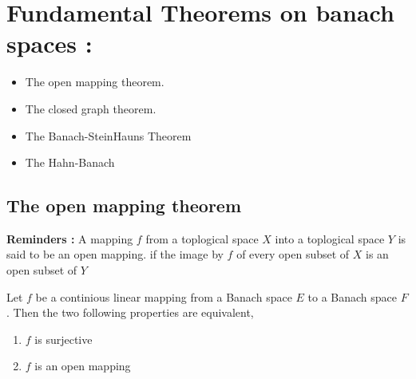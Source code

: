 \chapter{Fundamental Theorems on banach spaces : }
\begin{itemize}
	\item The open mapping theorem.
	\item The closed graph theorem.
	\item The Banach-SteinHauns Theorem
	\item The Hahn-Banach 
\end{itemize}
\section{The open mapping theorem}
\textbf{Reminders : } 
A mapping $f $ from a toplogical space $X $ into a toplogical
space $Y $ is said to be an open mapping. if the image by $f $
of every open subset of $X $ is an open subset of $Y $ 
\begin{theorem}
	Let $f $ be a continious linear mapping from 
	a Banach space $E $ to a Banach space $F $. Then
	the two following properties are equivalent,
	\begin{enumerate}[i]
	\item  $f $ is surjective
	\item $f $ is an open mapping 
	\end{enumerate}
\end{theorem}
